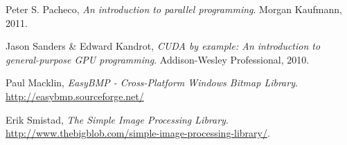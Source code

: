 \begin{thebibliography}{99}
	Peter S. Pacheco,
	\emph{An introduction to parallel programming}.
	Morgan Kaufmann,
	2011.

	Jason Sanders \& Edward Kandrot,
	\emph{CUDA by example: An introduction to general-purpose GPU programming}.
	Addison-Wesley Professional,
	2010.

	Paul Macklin,
	\emph{EasyBMP - Cross-Platform Windows Bitmap Library}.
	\url{http://easybmp.sourceforge.net/}

	Erik Smistad,
	\emph{The Simple Image Processing Library}.
	\url{http://www.thebigblob.com/simple-image-processing-library/}.
	
	

\end{thebibliography}
